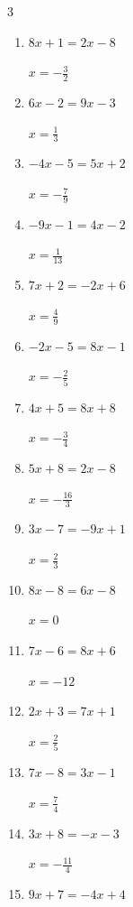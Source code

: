 \begin{multicols}{3}
\begin{enumerate}
  \item $8x+1=2x-8$

        $\displaystyle x=-\frac{3}{2}$

  \item $6x-2=9x-3$

        $\displaystyle x=\frac{1}{3}$

  \item $-4x-5=5x+2$

        $\displaystyle x=-\frac{7}{9}$

  \item $-9x-1=4x-2$

        $\displaystyle x=\frac{1}{13}$

\columnbreak %

  \item $7x+2=-2x+6$

        $\displaystyle x=\frac{4}{9}$

  \item $-2x-5=8x-1$

        $\displaystyle x=-\frac{2}{5}$

  \item $4x+5=8x+8$

        $\displaystyle x=-\frac{3}{4}$

  \item $5x+8=2x-8$

        $\displaystyle x=-\frac{16}{3}$

  \item $3x-7=-9x+1$

        $\displaystyle x=\frac{2}{3}$

  \item $8x-8=6x-8$

        $\displaystyle x=0$

  \item $7x-6=8x+6$

        $\displaystyle x=-12$

  \item $2x+3=7x+1$

        $\displaystyle x=\frac{2}{5}$

  \item $7x-8=3x-1$

        $\displaystyle x=\frac{7}{4}$

  \item $3x+8=-x-3$

        $\displaystyle x=-\frac{11}{4}$

  \item $9x+7=-4x+4$


\end{enumerate}
\end{multicols}
